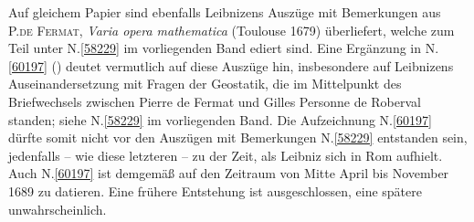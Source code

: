 Auf gleichem Papier sind ebenfalls Leibnizens Auszüge mit Bemerkungen aus \textsc{P.\;de Fermat}, \textit{Varia opera mathematica} (Toulouse 1679)\cite{00533} überliefert, welche zum Teil unter N.\;\ref{58229} im vorliegenden Band ediert sind.
Eine Ergänzung in N.\;\ref{60197} () deutet vermutlich auf diese Auszüge hin, insbesondere auf Leibnizens Auseinandersetzung mit Fragen der Geostatik, die im Mittelpunkt des Briefwechsels zwischen Pierre de Fermat und Gilles Personne de Roberval standen; siehe N.\;\ref{58229} im vorliegenden Band.
Die Aufzeichnung N.\;\ref{60197} dürfte somit nicht vor den Auszügen mit Bemerkungen N.\;\ref{58229} 
entstanden sein, jedenfalls -- wie diese letzteren -- zu der Zeit, als Leibniz sich in Rom aufhielt.
Auch N.\;\ref{60197} ist demgemäß auf den Zeitraum von Mitte April bis November 1689 zu datieren.
Eine frühere Entstehung ist ausgeschlossen, eine spätere unwahrscheinlich.
\pend%
%
\frenchspacing%
\normalsize%
